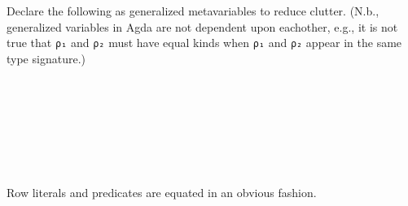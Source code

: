 \documentclass[authoryear, acmsmall, screen, review, nonacm]{acmart}
\begin{document}
Declare the following as generalized metavariables to reduce clutter. (N.b., generalized variables in Agda are not dependent upon eachother, e.g., it is not true that \verb!ρ₁! and \verb!ρ₂! must have equal kinds when \verb!ρ₁! and \verb!ρ₂! appear in the same type signature.)
\begin{code} %
\>[0]\<%
\\
\>[0][@{}l@{\AgdaIndent{0}}]%
\>[4]\<%
\\
\>[4][@{}l@{\AgdaIndent{0}}]%
\>[8]\AgdaSpace{}%
\AgdaSpace{}%
\AgdaSpace{}%
\AgdaSpace{}%
\AgdaSymbol{:}\AgdaSpace{}%
\<%
\\
%
\>[8]\AgdaSpace{}%
\AgdaSpace{}%
\AgdaSpace{}%
\AgdaSpace{}%
\AgdaSymbol{:}\AgdaSpace{}%
\AgdaSpace{}%
\AgdaSpace{}%
\<%
\\
%
\>[8]\AgdaSpace{}%
\AgdaSpace{}%
%
\>[19]\AgdaSymbol{:}\AgdaSpace{}%
\AgdaSpace{}%
\AgdaSpace{}%
\AgdaOperator{\AgdaInductiveConstructor{R[}}\AgdaSpace{}%
\AgdaSpace{}%
\AgdaOperator{\AgdaInductiveConstructor{]}}\<%
\\
%
\>[8]\AgdaSpace{}%
%
\>[17]\AgdaSymbol{:}\AgdaSpace{}%
\AgdaSpace{}%
\AgdaSpace{}%
\AgdaSpace{}%
\AgdaOperator{\AgdaInductiveConstructor{R[}}\AgdaSpace{}%
\AgdaSpace{}%
\AgdaOperator{\AgdaInductiveConstructor{]}}\<%
\\
%
\>[8]\AgdaSpace{}%
\AgdaSpace{}%
\AgdaSpace{}%
\AgdaSpace{}%
\AgdaSpace{}%
\AgdaSpace{}%
\AgdaSpace{}%
\AgdaSpace{}%
\AgdaSymbol{:}\AgdaSpace{}%
\AgdaSpace{}%
\AgdaSpace{}%
\<%
\end{code}

\Ni Row literals and predicates are equated in an obvious fashion.
\end{document}
